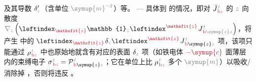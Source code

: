 及其导数 $\delta'_{\mathcolor{gray}{z}}$（含单位 $\mathcolor{gray}{\symup{m}^{-2}}$）等。 ---  具体到  的情况，即对 $\bar{J}^{\;\!\mathcolor{gray}{t}}_{\;\!\textcolor{Maroon}{\text{b}}\mathcolor{gray}{z}}$ 的 $\mathcolor{gray}{z}$ 向散度 $\mathcolor{gray}{\nabla_z} \left( \leftindex_{\textcolor{Maroon}{\mathsfit{z}}} {\mathbb{1}}_{\mathcolor{gray}{z}} \leftindex^{\textcolor{Maroon}{\mathsfit{z}}} \;\! J^{\;\!\mathcolor{gray}{t}}_{\;\!\textcolor{Maroon}{\text{b}} \mathcolor{gray}{\symup{z}} \mathcolor{gray}{z}} \right)$，将产生  中的 $\leftindex_{\textcolor{Maroon}{\mathsfit{z}}} \;\! \delta_{\mathcolor{gray}{z}} \leftindex^{\textcolor{Maroon}{\mathsfit{z}}} \;\! J^{\;\!\mathcolor{gray}{t}}_{\;\!\textcolor{Maroon}{\text{b}} \symup{z} \mathcolor{gray}{z}}$ 项，该项只能通过 ${\rho}^{\;\!\mathcolor{gray}{t}}_{\;\!\textcolor{Maroon}{\text{b}}\mathcolor{gray}{z}}$ 中也原始地就含有对应的表面 $\delta_{\mathcolor{gray}{z}}$ 项（如铁电体 $\textcolor{Maroon}{-\symup{c}}$ 面薄层内的束缚电子 ${\sigma}^{\;\!\mathcolor{gray}{t}}_{\;\!\textcolor{Maroon}{\text{b}}\mathcolor{gray}{z}} = {\mathcal{P}}^{\;\!\mathcolor{gray}{t}}_{\;\!\textcolor{Maroon}{\text{b}} \symup{z} \mathcolor{gray}{z}}$；它在单位上比 ${\rho}^{\;\!\mathcolor{gray}{t}}_{\;\!\textcolor{Maroon}{\text{b}}\mathcolor{gray}{z}}$ 多个 $\mathcolor{gray}{\symup{m}}$）以吸收/消除掉 \cite{grahamMultipoleSolutionMacroscopic2000}，否则将违反 。

